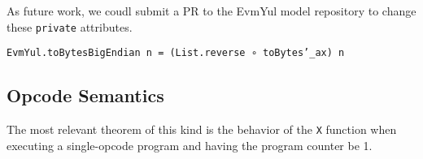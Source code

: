 As future work, we coudl submit a PR to the EvmYul model repository to change
these \texttt{private} attributes.

\begin{theorem}
\label{thm:toBytesBigEndian_rw}
\texttt{EvmYul.toBytesBigEndian n = (List.reverse ∘ toBytes'_ax) n}
\end{theorem}

\subsection{Opcode Semantics}

The most relevant theorem of this kind is the behavior of the \texttt{X}
function when executing a single-opcode program and having the program counter
be 1.

\begin{definition}\label{def:X}\leanok

\end{definition}
